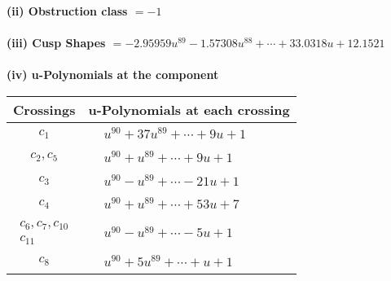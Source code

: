 \documentclass[1p]{elsarticle_modified}
\theoremstyle{definition}
\begin{document}
\flushleft \textbf{(ii) Obstruction class $= -1$}\\~\\
\flushleft \textbf{(iii) Cusp Shapes $= -2.95959 u^{89}-1.57308 u^{88}+\cdots+33.0318 u+12.1521$}\\~\\
\newpage\renewcommand{\arraystretch}{1}
\flushleft \textbf{(iv) u-Polynomials at the component}\newline \\
\begin{tabular}{m{50pt}|m{274pt}}
Crossings & \hspace{64pt}u-Polynomials at each crossing \\
\hline $$\begin{aligned}c_{1}\end{aligned}$$&$\begin{aligned}
&u^{90}+37 u^{89}+\cdots+9 u+1
\end{aligned}$\\
\hline $$\begin{aligned}c_{2},c_{5}\end{aligned}$$&$\begin{aligned}
&u^{90}+u^{89}+\cdots+9 u+1
\end{aligned}$\\
\hline $$\begin{aligned}c_{3}\end{aligned}$$&$\begin{aligned}
&u^{90}- u^{89}+\cdots-21 u+1
\end{aligned}$\\
\hline $$\begin{aligned}c_{4}\end{aligned}$$&$\begin{aligned}
&u^{90}+u^{89}+\cdots+53 u+7
\end{aligned}$\\
\hline $$\begin{aligned}c_{6},c_{7},c_{10}\\c_{11}\end{aligned}$$&$\begin{aligned}
&u^{90}- u^{89}+\cdots-5 u+1
\end{aligned}$\\
\hline $$\begin{aligned}c_{8}\end{aligned}$$&$\begin{aligned}
&u^{90}+5 u^{89}+\cdots+u+1
\end{aligned}$\\

\end{tabular}
\end{document}
